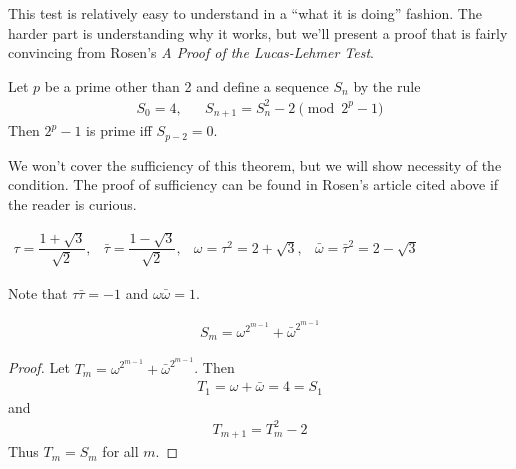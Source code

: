 This test is relatively easy to understand in a ``what it is doing'' fashion.  The harder part is understanding why it works, but we'll present a proof that is fairly convincing from Rosen's \emph{A Proof of the Lucas-Lehmer Test}\cite{rosen}.


\begin{thm} 
Let $p$ be a prime other than 2 and define a sequence $S_n$ by the rule
\begin{align}
\label{eqn:llt}
S_0 = 4,&&S_{n+1} = S_n^2 - 2 \pmod{2^p - 1}
\end{align}
Then $2^p - 1$ is prime iff $S_{p-2} = 0$.
\end{thm}

We won't cover the sufficiency of this theorem, but we will show necessity of the condition. The proof of sufficiency can be found in Rosen's article cited above if the reader is curious.    
\begin{center}
\begin{math}
\begin{array}{cccc}
\tau = \dfrac{1 + \sqrt{3}}{\sqrt{2}},&
\bar{\tau} = \dfrac{1 - \sqrt{3}}{\sqrt{2}},&
\omega = \tau^2 = 2 + \sqrt{3},&
\bar{\omega} = \bar{\tau}^2 = 2 - \sqrt{3}
\end{array}
\end{math}
\end{center}

Note that $\tau\bar{\tau} = -1$ and $\omega\bar{\omega} = 1$.

\begin{lem}
\begin{align*}
S_m = \omega^{2^{m-1}}+ \bar{\omega}^{2^{m-1}}
\end{align*}
\end{lem}
\begin{proof}
Let $T_m = \omega^{2^{m-1}}+ \bar{\omega}^{2^{m-1}}$.  Then 
\begin{align*}
T_1 = \omega + \bar{\omega} = 4 = S_1
\end{align*}
 and 
\begin{align*}
T_{m+1} = T_m^2 -2  
\end{align*}
Thus $T_m = S_m$ for all $m$.
\end{proof}

